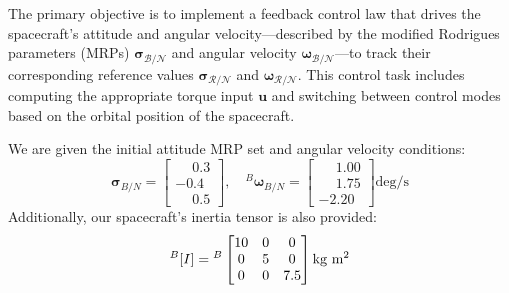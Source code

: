 \documentclass[conf]{new-aiaa}
\begin{document}
The primary objective is to implement a feedback control law that drives the spacecraft's attitude and angular velocity---described by the modified Rodrigues parameters (MRPs) $\bm{\sigma}_{\mathcal{B}/\mathcal{N}}$ and angular velocity $\bm{\omega}_{\mathcal{B}/\mathcal{N}}$---to track their corresponding reference values $\bm{\sigma}_{\mathcal{R}/\mathcal{N}}$ and $\bm{\omega}_{\mathcal{R}/\mathcal{N}}$. This control task includes computing the appropriate torque input $\bm{u}$ and switching between control modes based on the orbital position of the spacecraft.

We are given the initial attitude MRP set and angular velocity conditions:
\[
\bm{\sigma}_{B/N} =
\begin{bmatrix}
\phantom{-}0.3 \\ -0.4 \\ \phantom{-}0.5
\end{bmatrix}, \quad
{}^B\bm{\omega}_{B/N} =
\begin{bmatrix}
\phantom{-}1.00 \\ \phantom{-}1.75 \\ -2.20
\end{bmatrix} \text{deg/s}
\]
Additionally, our spacecraft's inertia tensor is also provided:
\[
{}^B[I] = {}^B\begin{bmatrix}
10 & 0 & 0 \\
0 & 5 & 0 \\
0 & 0 & 7.5
\end{bmatrix} \text{kg m\textsuperscript{2}}
\]
\end{document}
